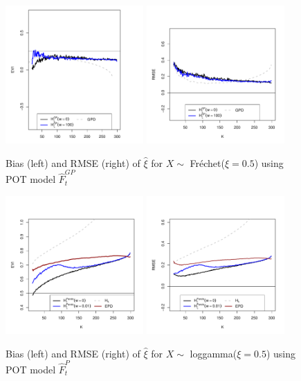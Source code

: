 \documentclass[a4paper,11pt]{article}
\begin{document}
\begin{figure}[!ht]
  \centering
 \includegraphics[width=0.47\textwidth]{EGP_frechet_xi_m16.pdf}
 \includegraphics[width=0.47\textwidth]{EGP_frechet_rmse_m16.pdf}        
\caption{\small Bias (left) and RMSE (right) of $\hat{\xi}$ for $X \sim$ Fr\'echet($\xi=0.5$) using POT model $\hat{F}^{GP}_t$} 
 \end{figure}

\begin{figure}[!ht]
  \centering
 \includegraphics[width=0.47\textwidth]{EP_loggamma_xi_m16.pdf}
 \includegraphics[width=0.47\textwidth]{EP_loggamma_rmse_m16.pdf}       
\caption{\small Bias (left) and RMSE (right) of $\hat{\xi}$ for $X \sim$ loggamma($\xi=0.5$) using POT model $\hat{F}^{P}_t$} 
 \end{figure}
\end{document}

